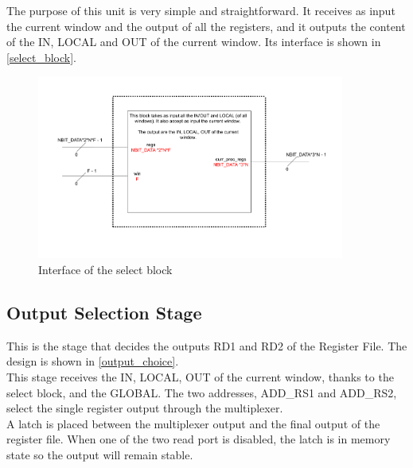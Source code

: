 The purpose of this unit is very simple and straightforward. It receives as input the current window and the output of all the registers, and it outputs the content of the IN, LOCAL and OUT of the current window. Its interface is shown in \autoref{select_block}.

\begin{figure}[ht]
  \centering
  \includegraphics[width=0.9\textwidth]{chapters/4_DecodeStage/images/select_block.pdf}
  \caption{Interface of the select block}
  \label{select_block}
\end{figure}

\subsection{Output Selection Stage}
This is the stage that decides the outputs RD1 and RD2 of the Register File. The design is shown in \autoref{output_choice}.\\

This stage receives the IN, LOCAL, OUT of the current window, thanks to the select block, and the GLOBAL. The two addresses, ADD\_RS1 and ADD\_RS2, select the single register output through the multiplexer.\\

A latch is placed between the multiplexer output and the final output of the register file. When one of the two read port is disabled, the latch is in memory state so the output will remain stable.

